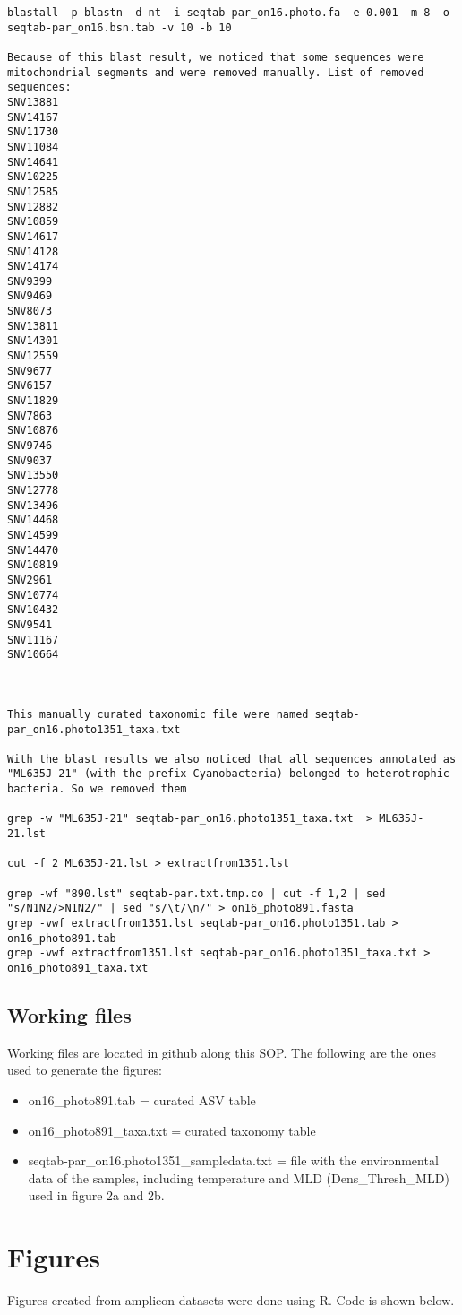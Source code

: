 \documentclass{article}
\begin{document}
\begin{lstlisting}[language=shellcmd,caption={Extracting only Photosynthetic sequences using shell commands}]
blastall -p blastn -d nt -i seqtab-par_on16.photo.fa -e 0.001 -m 8 -o seqtab-par_on16.bsn.tab -v 10 -b 10

Because of this blast result, we noticed that some sequences were mitochondrial segments and were removed manually. List of removed sequences: 
SNV13881	
SNV14167		
SNV11730	
SNV11084
SNV14641
SNV10225
SNV12585
SNV12882
SNV10859
SNV14617
SNV14128
SNV14174
SNV9399
SNV9469
SNV8073
SNV13811
SNV14301
SNV12559
SNV9677
SNV6157
SNV11829
SNV7863
SNV10876
SNV9746
SNV9037
SNV13550
SNV12778
SNV13496
SNV14468
SNV14599
SNV14470
SNV10819
SNV2961
SNV10774
SNV10432
SNV9541
SNV11167
SNV10664



This manually curated taxonomic file were named seqtab-par_on16.photo1351_taxa.txt

With the blast results we also noticed that all sequences annotated as "ML635J-21" (with the prefix Cyanobacteria) belonged to heterotrophic bacteria. So we removed them 

grep -w "ML635J-21" seqtab-par_on16.photo1351_taxa.txt  > ML635J-21.lst

cut -f 2 ML635J-21.lst > extractfrom1351.lst

grep -wf "890.lst" seqtab-par.txt.tmp.co | cut -f 1,2 | sed "s/N1N2/>N1N2/" | sed "s/\t/\n/" > on16_photo891.fasta
grep -vwf extractfrom1351.lst seqtab-par_on16.photo1351.tab > on16_photo891.tab
grep -vwf extractfrom1351.lst seqtab-par_on16.photo1351_taxa.txt > on16_photo891_taxa.txt

\end{lstlisting}

\subsection{Working files}

Working files are located in github along this SOP. The following are the ones used to generate the figures:
\begin{itemize}
\item on16\_photo891.tab = curated ASV table 
\item on16\_photo891\_taxa.txt = curated taxonomy table
\item seqtab-par\_on16.photo1351\_sampledata.txt = file with the environmental data of the samples, including temperature and MLD (Dens\_Thresh\_MLD) used in figure 2a and 2b. 
\end{itemize}

\section{Figures}
Figures created from amplicon datasets were done using R. Code is shown below.
\end{document}
